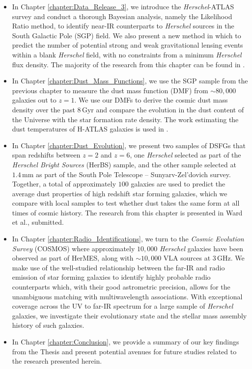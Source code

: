 \begin{itemize}
	\item In Chapter \ref{chapter:Data_Release_3}, we introduce the \textit{Herschel}-ATLAS survey and conduct a thorough Bayesian analysis, namely the Likelihood Ratio method, to identify near-IR counterparts to \textit{Herschel} sources in the South Galactic Pole (SGP) field. We also present a new method in which to predict the number of potential strong and weak gravitational lensing events within a blank \textit{Herschel} field, with no constraints from a minimum \textit{Herschel} flux density. The majority of the research from this chapter can be found in \citealt{Ward_2022}.
	\item In Chapter \ref{chapter:Dust_Mass_Functions}, we use the SGP sample from the previous chapter to measure the dust mass function (DMF) from $\sim80,000$ galaxies out to $z = 1$. We use our DMFs to derive the cosmic dust mass density over the past $8\,$Gyr and compare the evolution in the dust content of the Universe with the star formation rate density. The work estimating the dust temperatures of H-ATLAS galaxies is used in \citealt{Eales_2024}.
	\item In Chapter \ref{chapter:Dust_Evolution}, we present two samples of DSFGs that span redshifts between $z = 2$ and $z = 6$, one \textit{Herschel} selected as part of the \textit{Herschel Bright Sources} (HerBS) sample, and the other sample selected at $1.4\,$mm as part of the South Pole Telescope -- Sunyarv-Zel'dovich survey. Together, a total of approximately $100$ galaxies are used to predict the average dust properties of high redshift star forming galaxies, which we compare with local samples to test whether dust takes the same form at all times of cosmic history. The research from this chapter is presented in Ward et al., submitted.
	\item In Chapter \ref{chapter:Radio_Identifications}, we turn to the \textit{Cosmic Evolution Survey} (COSMOS) where approximately $10,000$ \textit{Herschel} galaxies have been observed as part of HerMES, along with $\sim10,000$ VLA sources at $3\,$GHz. We make use of the well-studied relationship between the far-IR and radio emission of star forming galaxies to identify highly probable radio counterparts which, with their good astrometric precision, allows for the unambiguous matching with multiwavelength associations. With exceptional coverage across the UV to far-IR spectrum for a large sample of \textit{Herschel} galaxies, we investigate their evolutionary state and the stellar mass assembly history of such galaxies.
	\item In Chapter \ref{chapter:Conclusion}, we provide a summary of our key findings from the Thesis and present potential avenues for future studies related to the research presented herein.
\end{itemize}

